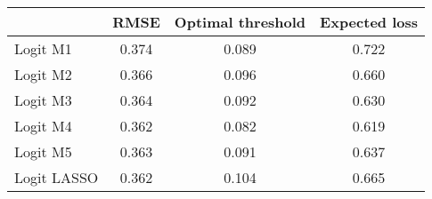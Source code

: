 \begin{tabular}{lccc}
\toprule
 & RMSE & Optimal threshold & Expected loss \\
\midrule
Logit M1    & 0.374 & 0.089    & 0.722 \\
Logit M2    & 0.366 & 0.096    & 0.660 \\
Logit M3    & 0.364 & 0.092    & 0.630 \\
Logit M4    & 0.362 & 0.082    & 0.619 \\
Logit M5    & 0.363 & 0.091    & 0.637 \\
Logit LASSO & 0.362 & 0.104    & 0.665 \\
\bottomrule
\end{tabular}%
